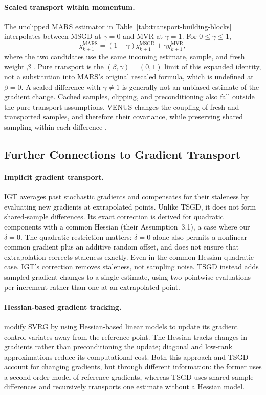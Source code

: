 \paragraph{Scaled transport within momentum.}
The unclipped MARS estimator in
Table~\ref{tab:transport-building-blocks} interpolates between MSGD
at $\gamma=0$ and MVR at $\gamma=1$. For $0\leq\gamma\leq1$,
\[
g_{k+1}^{\mathrm{MARS}}
=(1-\gamma)g_{k+1}^{\mathrm{MSGD}}
+\gamma g_{k+1}^{\mathrm{MVR}},
\]
where the two candidates use the same incoming estimate, sample,
and fresh weight $\beta$ \citep{venus2026draft}.
Pure transport is the $(\beta,\gamma)=(0,1)$ limit of this expanded
identity, not a substitution into MARS's original rescaled formula,
which is undefined at $\beta=0$.
A scaled difference with $\gamma\ne1$ is generally not an unbiased
estimate of the gradient change. Cached samples, clipping, and
preconditioning also fall outside the pure-transport assumptions.
VENUS changes the coupling of fresh and transported samples, and
therefore their covariance, while preserving shared sampling within
each difference \citep{venus2026draft}.

\subsection{Further Connections to Gradient Transport}
\label{app:related-transport}

\paragraph{Implicit gradient transport.}
IGT \citep{arnold2019reducingvarianceonlineoptimization} averages past
stochastic gradients and compensates for their staleness by evaluating
new gradients at extrapolated points. Unlike TSGD, it does not form
shared-sample differences. Its exact correction is derived for quadratic
components with a common Hessian (their Assumption~3.1), a case where
our $\delta=0$. The quadratic restriction matters: $\delta=0$ alone
also permits a nonlinear common gradient plus an additive random offset,
and does not ensure that extrapolation corrects staleness exactly.
Even in the common-Hessian quadratic case, IGT's correction removes
staleness, not sampling noise. TSGD instead adds sampled gradient
changes to a single estimate, using two pointwise evaluations per
increment rather than one at an extrapolated point.

\paragraph{Hessian-based gradient tracking.}
\citet{gower2018trackinggradientsusinghessian} modify SVRG by using
Hessian-based linear models to update its gradient control variates
away from the reference point. The Hessian tracks changes in gradients
rather than preconditioning the update; diagonal and low-rank
approximations reduce its computational cost. Both this approach and
TSGD account for changing gradients, but through different information:
the former uses a second-order model of reference gradients, whereas
TSGD uses shared-sample differences and recursively transports one
estimate without a Hessian model.

